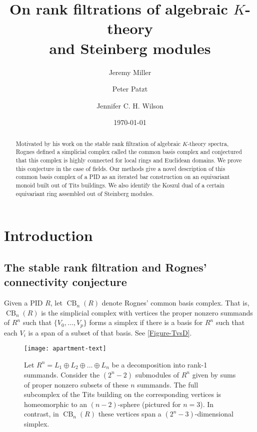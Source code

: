 \documentclass[a4paper]{amsart}
\title[On  rank filtrations of algebraic $K$-theory and Steinberg modules]{On  rank filtrations of algebraic $K$-theory\\ and Steinberg modules}
\author{Jeremy Miller}\thanks{Jeremy Miller was supported in part by NSF Grant DMS-2202943 and a Simons Foundation Collaboration Grant}
\author{Peter Patzt}
\author{Jennifer C. H. Wilson}
\date{\today}
\DeclareMathOperator{\CB}{CB}
\numberwithin{theoremcounter}{section}
\theoremstyle{definition}
\theoremstyle{remark}
\begin{document}
	
\begin{abstract} Motivated by his work on the stable rank filtration of algebraic $K$-theory spectra, Rognes defined a simplicial complex called the common basis complex and conjectured that this complex is highly connected for local rings and Euclidean domains. We prove this conjecture in the case of fields. Our methods give a novel description of this common basis complex of a PID as an iterated bar construction on an equivariant monoid built out of Tits buildings. We also identify the Koszul dual of a certain equivariant ring assembled out of Steinberg modules.

 \end{abstract}

\maketitle



\tableofcontents


\section{Introduction}




\subsection{The stable rank filtration and Rognes' connectivity conjecture} 



Given a PID $R$, let ${\CB}_n(R)$ denote Rognes' common basis complex. That is, ${\CB}_n(R)$ is the simplicial complex with vertices the proper nonzero summands of $R^n$ such that $\{V_0,\dots, V_p\}$ forms a simplex if there is a basis for $R^n$ such that each $V_i$ is a span of a subset of that basis. See \autoref{Figure-TvsD}.
\begin{figure}[h!]
\texttt{[image: apartment-text]} 
\caption{Let $R^n = L_1 \oplus L_2 \oplus \dots \oplus L_n$ be a decomposition into rank-1 summands. Consider the $(2^n-2)$ submodules of $R^n$ given by sums of proper nonzero subsets of these $n$ summands. The full subcomplex of the Tits building on the corresponding vertices is homeomorphic to an $(n-2)$-sphere (pictured for $n=3$). In contrast, in ${\CB}_n(R)$ these vertices span a $(2^n-3)$-dimensional simplex.} 
\label{Figure-TvsD}
\end{figure} 
\end{document}
